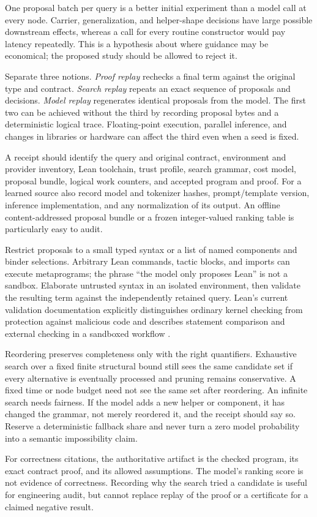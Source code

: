One proposal batch per query is a better initial experiment than a model call
at every node. Carrier, generalization, and helper-shape decisions have large
possible downstream effects, whereas a call for every routine constructor
would pay latency repeatedly. This is a hypothesis about where guidance may
be economical; the proposed study should be allowed to reject it.


Separate three notions. \emph{Proof replay} rechecks a final term against the
original type and contract. \emph{Search replay} repeats an exact sequence of
proposals and decisions. \emph{Model replay} regenerates identical proposals
from the model. The first two can be achieved without the third by recording
proposal bytes and a deterministic logical trace. Floating-point execution,
parallel inference, and changes in libraries or hardware can affect the third
even when a seed is fixed.

A receipt should identify the query and original contract, environment and
provider inventory, Lean toolchain, trust profile, search grammar, cost model,
proposal bundle, logical work counters, and accepted program and proof. For a
learned source also record model and tokenizer hashes, prompt/template version,
inference implementation, and any normalization of its output. An offline
content-addressed proposal bundle or a frozen integer-valued ranking table is
particularly easy to audit.

Restrict proposals to a small typed syntax or a list of named components and
binder selections. Arbitrary Lean commands, tactic blocks, and imports can
execute metaprograms; the phrase ``the model only proposes Lean'' is not a
sandbox. Elaborate untrusted syntax in an isolated environment, then validate
the resulting term against the independently retained query. Lean's current
validation documentation explicitly distinguishes ordinary kernel checking
from protection against malicious code and describes statement comparison and
external checking in a sandboxed workflow \cite{leanvalidation}.

Reordering preserves completeness only with the right quantifiers. Exhaustive
search over a fixed finite structural bound still sees the same candidate set
if every alternative is eventually processed and pruning remains conservative.
A fixed time or node budget need not see the same set after reordering. An
infinite search needs fairness. If the model adds a new helper or component,
it has changed the grammar, not merely reordered it, and the receipt should
say so. Reserve a deterministic fallback share and never turn a zero model
probability into a semantic impossibility claim.

For correctness citations, the authoritative artifact is the checked program,
its exact contract proof, and its allowed assumptions. The model's ranking
score is not evidence of correctness. Recording why the search tried a
candidate is useful for engineering audit, but cannot replace replay of the
proof or a certificate for a claimed negative result.
